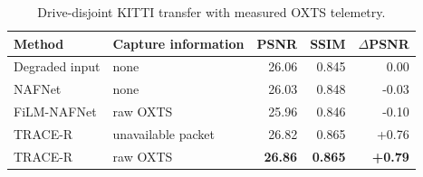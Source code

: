 \begin{table}[!t]
\centering
\caption{Drive-disjoint KITTI transfer with measured OXTS telemetry.}
\label{tab:kitti}
\footnotesize
\setlength{\tabcolsep}{3.7pt}
\begin{tabular}{llrrr}
\toprule
Method & Capture information & PSNR & SSIM & $\Delta$PSNR \\
\midrule
Degraded input & none & 26.06 & 0.845 & 0.00 \\
NAFNet & none & 26.03 & 0.848 & -0.03 \\
FiLM-NAFNet & raw OXTS & 25.96 & 0.846 & -0.10 \\
TRACE-R & unavailable packet & 26.82 & 0.865 & +0.76 \\
TRACE-R & raw OXTS & \textbf{26.86} & \textbf{0.865} & \textbf{+0.79} \\
\bottomrule
\end{tabular}
\end{table}

